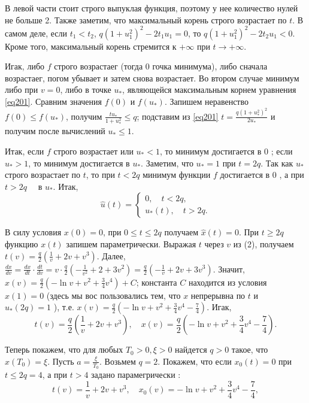 \begin{task}
    В левой части стоит строго выпуклая функция, поэтому у нее количество нулей не больше 2. Также заметим, что максимальный корень строго возрастает по $t$. 
    В самом деле, если 
    $t_1<t_2$, $q\left(1+u_1^2\right)^2-2 t_1 u_1 = 0$, 
    то ${ q\left(1+u_1^2\right) ^2 - 2 t_2 u_1<0 } $. 
    Кроме того, максимальный корень стремится к $+\infty$ при $t \rightarrow+\infty$.

    Игак, либо $f$ строго возрастаег (тогда 0 гочка минимума), либо сначала возрастаег, погом убывает и затем снова возрастает. 
    Во втором случае минимум либо при $v=0$, либо в точке $u_*$, являющейся максимальным корнем уравнения \eqref{eq201}. 
    Сравним значения $f(0)$ и $f\left(u_*\right)$. Запишем неравенство $f(0) \leq f\left(u_*\right)$, получим $\frac{t u_*}{1+u_*^2} \leq q$; 
    подставим из \eqref{eq201} $t=\frac{q\left(1+u_*^2\right)^2}{2 u_*}$ и получим после вычислений $u_* \leq 1$.

    Итак, если $f$ строго возрастает или $u_*<1$, то минимум достигается в 0 ; если $u_*>1$, то минимум достигается в $u_*$. Заметим, что $u_*=1$ при $t=2 q$. 
    Так как $u_*$ строго возрастает по $t$, то при $t<2 q$ минимум функции $f$ достигается в 0 , а при $t>2 q \quad$ в $u_*$.
    Итак,
    $$
        \hat{u}(t)=\begin{cases} 
            0, \quad t<2 q, 
            \\
            u_*(t), \quad t>2 q .
        \end{cases}
    $$

    В силу условия $x(0)=0$, при $0 \leq t \leq 2 q$ получаем $\hat{x}(t)=0$.
    При $t \geq 2 q$ функцию $x(t)$ запишем параметрически. Выражая $t$ через $v$ из (2), получаем $t(v)=\frac{q}{2}\left(\frac{1}{v}+2 v+v^3\right)$. Далее, $\frac{d x}{d v}=\frac{d x}{d t} \cdot \frac{d t}{d v}=v \cdot \frac{q}{2}\left(-\frac{1}{v^2}+2+3 v^2\right)=\frac{q}{2}\left(-\frac{1}{v}+2 v+3 v^3\right)$. Значит, $x(v)=\frac{q}{2}\left(-\ln v+v^2+\frac{3}{4} v^4\right)+C$; константа $C$ находится из условия $x(1)=0$ (здесь мы вос пользовались тем, что $x$ непрерывна по $t$ и $u_*(2 q)=1$ ), т.е. $x(v)=\frac{q}{2}\left(-\ln v+v^2+\frac{3}{4} v^4-\frac{7}{4}\right)$. Игак,
    $$
        t(v)=\frac{q}{2}\left(\frac{1}{v}+2 v+v^3\right), \quad x(v)=\frac{q}{2}\left(-\ln v+v^2+\frac{3}{4} v^4-\frac{7}{4}\right) .
    $$

    Теперь покажем, что для любых $T_0>0, \xi>0$ найдется $q>0$ такое, что $x\left(T_0\right)=\xi$.
    Пусть $a=\frac{\xi}{T_0}$. Возьмем $q=2$. Покажем, что если $x_0(t)=0$ при $t \leq 2 q=4$, а при $t>4$ задано парамегрически :
    $$
        t(v)=\frac{1}{v}+2 v+v^3, \quad x_0(v)=-\ln v+v^2+\frac{3}{4} v^4-\frac{7}{4},
    $$


\end{task}

